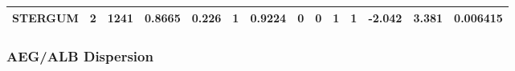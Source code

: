 \begin{longtable}[]{@{}cccccccccccccc@{}}
\begin{minipage}[t]{0.07\columnwidth}
\textbf{STERGUM}\strut
\end{minipage} & \begin{minipage}[t]{0.04\columnwidth}\centering\strut
2\strut
\end{minipage} & \begin{minipage}[t]{0.04\columnwidth}\centering\strut
1241\strut
\end{minipage} & \begin{minipage}[t]{0.05\columnwidth}\centering\strut
0.8665\strut
\end{minipage} & \begin{minipage}[t]{0.05\columnwidth}\centering\strut
0.226\strut
\end{minipage} & \begin{minipage}[t]{0.05\columnwidth}\centering\strut
1\strut
\end{minipage} & \begin{minipage}[t]{0.05\columnwidth}\centering\strut
0.9224\strut
\end{minipage} & \begin{minipage}[t]{0.05\columnwidth}\centering\strut
0\strut
\end{minipage} & \begin{minipage}[t]{0.03\columnwidth}\centering\strut
0\strut
\end{minipage} & \begin{minipage}[t]{0.03\columnwidth}\centering\strut
1\strut
\end{minipage} & \begin{minipage}[t]{0.04\columnwidth}\centering\strut
1\strut
\end{minipage} & \begin{minipage}[t]{0.05\columnwidth}\centering\strut
-2.042\strut
\end{minipage} & \begin{minipage}[t]{0.06\columnwidth}\centering\strut
3.381\strut
\end{minipage} & \begin{minipage}[t]{0.06\columnwidth}\centering\strut
0.006415\strut
\end{minipage}\tabularnewline
\bottomrule
\end{longtable}

\subsubsection{AEG/ALB Dispersion}\label{aegalb-dispersion}

\begin{Shaded}
\begin{Highlighting}[]
\NormalTok{(sternite[,}\NormalTok{:}\NormalTok{], }\NormalTok{(}\NormalTok{), }\NormalTok{)}
\end{Highlighting}
\end{Shaded}

